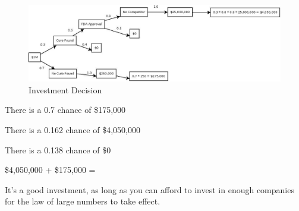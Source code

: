 \documentclass[letterpaper, landscape]{exam}
\begin{document}
  \begin{figure}[H]
    \centering
    \includegraphics[scale = 0.25]{investment.jpeg}
    \caption{Investment Decision}
  \end{figure}

  \begin{solution}
    \begin{itemize*}
      \item There is a 0.7 chance of \$175,000 
      \item There is a 0.162 chance of \$4,050,000 
      \item There is a 0.138 chance of \$0
    \end{itemize*}
    
    \$4,050,000 + \$175,000 = 

    It's a good investment, as long as you can afford to invest in enough
    companies for the law of large numbers to take effect.

   \end{solution}
\end{document}
